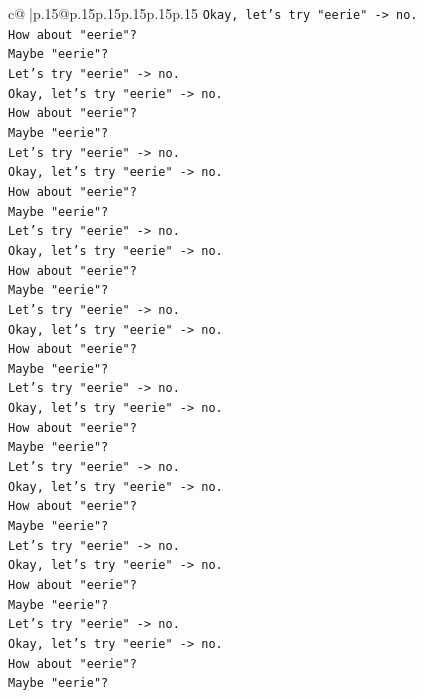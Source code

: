 \documentclass{article}
\begin{document}
{\begin{supertabular}{c@{$\;$}|p{.15\linewidth}@{}p{.15\linewidth}p{.15\linewidth}p{.15\linewidth}p{.15\linewidth}p{.15\linewidth}}
{{{\texttt{Okay, let's try "eerie" {-}> no.} \\
\texttt{How about "eerie"?} \\
\texttt{Maybe "eerie"?} \\
\texttt{Let's try "eerie" {-}> no.} \\
\texttt{Okay, let's try "eerie" {-}> no.} \\
\texttt{How about "eerie"?} \\
\texttt{Maybe "eerie"?} \\
\texttt{Let's try "eerie" {-}> no.} \\
\texttt{Okay, let's try "eerie" {-}> no.} \\
\texttt{How about "eerie"?} \\
\texttt{Maybe "eerie"?} \\
\texttt{Let's try "eerie" {-}> no.} \\
\texttt{Okay, let's try "eerie" {-}> no.} \\
\texttt{How about "eerie"?} \\
\texttt{Maybe "eerie"?} \\
\texttt{Let's try "eerie" {-}> no.} \\
\texttt{Okay, let's try "eerie" {-}> no.} \\
\texttt{How about "eerie"?} \\
\texttt{Maybe "eerie"?} \\
\texttt{Let's try "eerie" {-}> no.} \\
\texttt{Okay, let's try "eerie" {-}> no.} \\
\texttt{How about "eerie"?} \\
\texttt{Maybe "eerie"?} \\
\texttt{Let's try "eerie" {-}> no.} \\
\texttt{Okay, let's try "eerie" {-}> no.} \\
\texttt{How about "eerie"?} \\
\texttt{Maybe "eerie"?} \\
\texttt{Let's try "eerie" {-}> no.} \\
\texttt{Okay, let's try "eerie" {-}> no.} \\
\texttt{How about "eerie"?} \\
\texttt{Maybe "eerie"?} \\
\texttt{Let's try "eerie" {-}> no.} \\
\texttt{Okay, let's try "eerie" {-}> no.} \\
\texttt{How about "eerie"?} \\
\texttt{Maybe "eerie"?} \\
}}}
\end{supertabular}}
\end{document}
